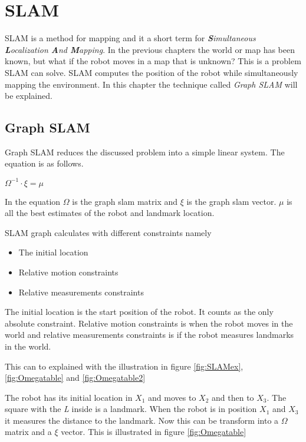 \chapter{SLAM}
\label{chp:slam}

SLAM is a method for mapping and it a short term for \emph{\textbf{S}imultaneous \textbf{L}ocalization \textbf{A}nd \textbf{M}apping}.
In the previous chapters the world or map has been known, but what if the robot moves in a map that is unknown? This is a problem SLAM can solve. SLAM computes the position of the robot while simultaneously mapping the environment. In this chapter the technique called \emph{Graph SLAM} will be explained.

\section{Graph SLAM}

Graph SLAM reduces the discussed problem into a simple linear system. The equation is as follows.

\begin{center}
	$\Omega^{-1} \cdot \xi = \mu$
\end{center}

In the equation $\Omega$ is the graph slam matrix and $\xi$ is the graph slam vector. $\mu$ is all the best estimates of the robot and landmark location.

SLAM graph calculates with different constraints namely

\begin{itemize}
	\item The initial location
	\item Relative motion constraints
	\item Relative measurements constraints
\end{itemize}

The initial location is the start position of the robot. It counts as the only absolute constraint. Relative motion constraints is when the robot moves in the world and relative measurements constraints is if the robot measures landmarks in the world.

This can to explained with the illustration in figure \ref{fig:SLAMex}, \ref{fig:Omegatable} and \ref{fig:Omegatable2}

 
The robot has its initial location in $X_1$ and moves to $X_2$ and then to $X_3$. The square with the \emph{L} inside is a landmark. When the robot is in position $X_1$ and $X_3$ it measures the distance to the landmark.
Now this can be transform into a $\Omega$ matrix and a $\xi$ vector. This is illustrated in figure \ref{fig:Omegatable}

